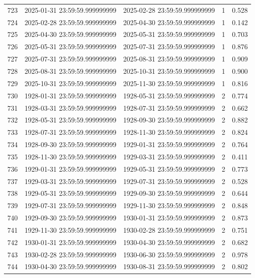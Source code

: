 \begin{table}
\begin{tabular}{lcccc}
723 & 2025-01-31 23:59:59.999999999 & 2025-02-28 23:59:59.999999999 & 1 & 0.528 \\
724 & 2025-02-28 23:59:59.999999999 & 2025-04-30 23:59:59.999999999 & 1 & 0.142 \\
725 & 2025-04-30 23:59:59.999999999 & 2025-05-31 23:59:59.999999999 & 1 & 0.703 \\
726 & 2025-05-31 23:59:59.999999999 & 2025-07-31 23:59:59.999999999 & 1 & 0.876 \\
727 & 2025-07-31 23:59:59.999999999 & 2025-08-31 23:59:59.999999999 & 1 & 0.909 \\
728 & 2025-08-31 23:59:59.999999999 & 2025-10-31 23:59:59.999999999 & 1 & 0.900 \\
729 & 2025-10-31 23:59:59.999999999 & 2025-11-30 23:59:59.999999999 & 1 & 0.816 \\
730 & 1928-01-31 23:59:59.999999999 & 1928-05-31 23:59:59.999999999 & 2 & 0.774 \\
731 & 1928-03-31 23:59:59.999999999 & 1928-07-31 23:59:59.999999999 & 2 & 0.662 \\
732 & 1928-05-31 23:59:59.999999999 & 1928-09-30 23:59:59.999999999 & 2 & 0.882 \\
733 & 1928-07-31 23:59:59.999999999 & 1928-11-30 23:59:59.999999999 & 2 & 0.824 \\
734 & 1928-09-30 23:59:59.999999999 & 1929-01-31 23:59:59.999999999 & 2 & 0.764 \\
735 & 1928-11-30 23:59:59.999999999 & 1929-03-31 23:59:59.999999999 & 2 & 0.411 \\
736 & 1929-01-31 23:59:59.999999999 & 1929-05-31 23:59:59.999999999 & 2 & 0.773 \\
737 & 1929-03-31 23:59:59.999999999 & 1929-07-31 23:59:59.999999999 & 2 & 0.528 \\
738 & 1929-05-31 23:59:59.999999999 & 1929-09-30 23:59:59.999999999 & 2 & 0.644 \\
739 & 1929-07-31 23:59:59.999999999 & 1929-11-30 23:59:59.999999999 & 2 & 0.848 \\
740 & 1929-09-30 23:59:59.999999999 & 1930-01-31 23:59:59.999999999 & 2 & 0.873 \\
741 & 1929-11-30 23:59:59.999999999 & 1930-02-28 23:59:59.999999999 & 2 & 0.751 \\
742 & 1930-01-31 23:59:59.999999999 & 1930-04-30 23:59:59.999999999 & 2 & 0.682 \\
743 & 1930-02-28 23:59:59.999999999 & 1930-06-30 23:59:59.999999999 & 2 & 0.978 \\
744 & 1930-04-30 23:59:59.999999999 & 1930-08-31 23:59:59.999999999 & 2 & 0.802 \\

\end{tabular}
\end{table}
